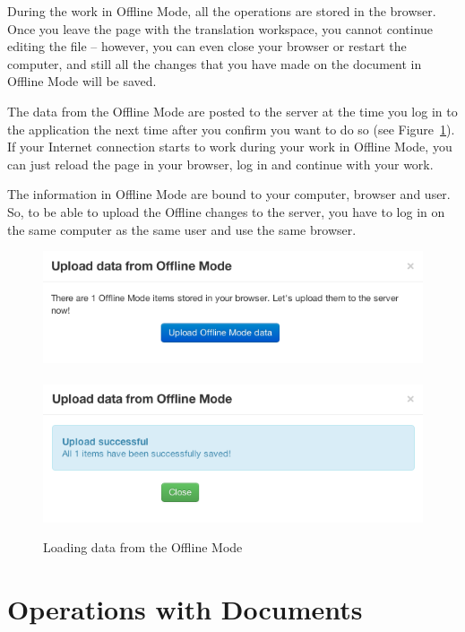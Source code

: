 During the work in Offline Mode, all the operations are stored in the browser. Once you leave the page with the translation workspace, you cannot continue editing the file -- however, you can even close your browser or restart the computer, and still all the changes that you have made on the document in Offline Mode will be saved.

The data from the Offline Mode are posted to the server at the time you log in to the application the next time after you confirm you want to do so (see Figure~\ref{fig:offline_loading}). If your Internet connection starts to work during your work in Offline Mode, you can just reload the page in your browser, log in and continue with your work.

The information in Offline Mode are bound to your computer, browser and user. So, to be able to upload the Offline changes to the server, you have to log in on the same computer as the same user and use the same browser.

\begin{figure}[h]
\begin{center}
\includegraphics[scale=0.4]{figures/user_manual/upload_offline_mode.png}~~~~
\includegraphics[scale=0.4]{figures/user_manual/upload_offline_mode_success.png}
\end{center}
\caption{Loading data from the Offline Mode}
\label{fig:offline_loading}
\end{figure}

\newpage
\section{Operations with Documents}
\label{um:sec:docoperations}


